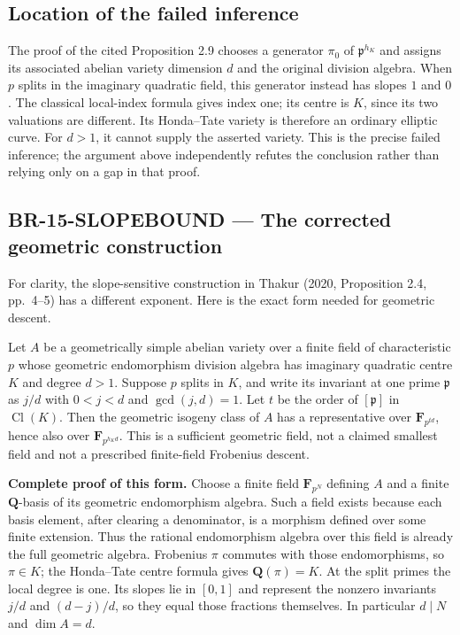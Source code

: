 \subsection{Location of the failed inference}

The proof of the cited Proposition 2.9 chooses a generator $\pi_0$
of $\mathfrak p^{h_K}$ and assigns its associated abelian variety
dimension $d$ and the original division algebra. When $p$ splits
in the imaginary quadratic field, this generator instead has slopes
$1$ and $0$. The classical local-index formula gives index one;
its centre is $K$, since its two valuations are different. Its
Honda--Tate variety is therefore an ordinary elliptic curve.
For $d>1$, it cannot supply the asserted variety. This is the
precise failed inference; the argument above independently
refutes the conclusion rather than relying only on a gap in that
proof.

\subsection{BR-15-SLOPEBOUND --- The corrected geometric construction}

For clarity, the slope-sensitive construction in Thakur (2020,
Proposition 2.4, pp.~4--5) has a different exponent. Here is the
exact form needed for geometric descent.

Let $A$ be a geometrically simple abelian variety over a finite field
of characteristic $p$ whose geometric endomorphism division algebra has imaginary
quadratic centre $K$ and degree $d>1$. Suppose $p$ splits in $K$,
and write its invariant at one prime $\mathfrak p$ as $j/d$ with
$0<j<d$ and $\gcd(j,d)=1$. Let $t$ be the order of
$[\mathfrak p]$ in $\operatorname{Cl}(K)$. Then the geometric
isogeny class of $A$ has a representative over
$\mathbf F_{p^{td}}$, hence also over $\mathbf F_{p^{h_Kd}}$.
This is a sufficient geometric field, not a claimed smallest field
and not a prescribed finite-field Frobenius descent.

\textbf{Complete proof of this form.} Choose a finite field
$\mathbf F_{p^N}$ defining $A$ and a finite $\mathbf Q$-basis of
its geometric endomorphism algebra. Such a field exists because each
basis element, after clearing a denominator, is a morphism defined
over some finite extension. Thus the rational endomorphism algebra
over this field is already the full geometric algebra.
Frobenius $\pi$ commutes with those endomorphisms, so $\pi\in K$;
the Honda--Tate centre formula gives $\mathbf Q(\pi)=K$.
At the split primes the local degree is one. Its slopes lie in
$[0,1]$ and represent the nonzero invariants $j/d$ and
$(d-j)/d$, so they equal those fractions themselves. In particular
$d\mid N$ and $\dim A=d$.

